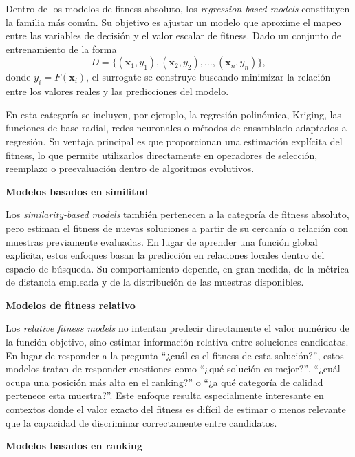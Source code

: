 Dentro de los modelos de fitness absoluto, los \textit{regression-based models} constituyen la familia más común. Su objetivo es ajustar un modelo que aproxime el mapeo entre las variables de decisión y el valor escalar de fitness. Dado un conjunto de entrenamiento de la forma
\[
    D=\{(\mathbf{x}_1,y_1),(\mathbf{x}_2,y_2),\dots,(\mathbf{x}_n,y_n)\},
\]
donde \(y_i=F(\mathbf{x}_i)\), el surrogate se construye buscando minimizar la relación entre los valores reales y las predicciones del modelo.

En esta categoría se incluyen, por ejemplo, la regresión polinómica, Kriging, las funciones de base radial, redes neuronales o métodos de ensamblado adaptados a regresión. Su ventaja principal es que proporcionan una estimación explícita del fitness, lo que permite utilizarlos directamente en operadores de selección, reemplazo o preevaluación dentro de algoritmos evolutivos.

\smallskip
\noindent\textbf{Modelos basados en similitud}\par
\smallskip

Los \textit{similarity-based models} también pertenecen a la categoría de fitness absoluto, pero estiman el fitness de nuevas soluciones a partir de su cercanía o relación con muestras previamente evaluadas. En lugar de aprender una función global explícita, estos enfoques basan la predicción en relaciones locales dentro del espacio de búsqueda. Su comportamiento depende, en gran medida, de la métrica de distancia empleada y de la distribución de las muestras disponibles.

\medskip
\noindent\textbf{\large Modelos de fitness relativo}\par
\smallskip

Los \textit{relative fitness models} no intentan predecir directamente el valor numérico de la función objetivo, sino estimar información relativa entre soluciones candidatas. En lugar de responder a la pregunta “¿cuál es el fitness de esta solución?”, estos modelos tratan de responder cuestiones como “¿qué solución es mejor?”, “¿cuál ocupa una posición más alta en el ranking?” o “¿a qué categoría de calidad pertenece esta muestra?”. Este enfoque resulta especialmente interesante en contextos donde el valor exacto del fitness es difícil de estimar o menos relevante que la capacidad de discriminar correctamente entre candidatos.

\smallskip
\noindent\textbf{Modelos basados en ranking}\par
\smallskip

